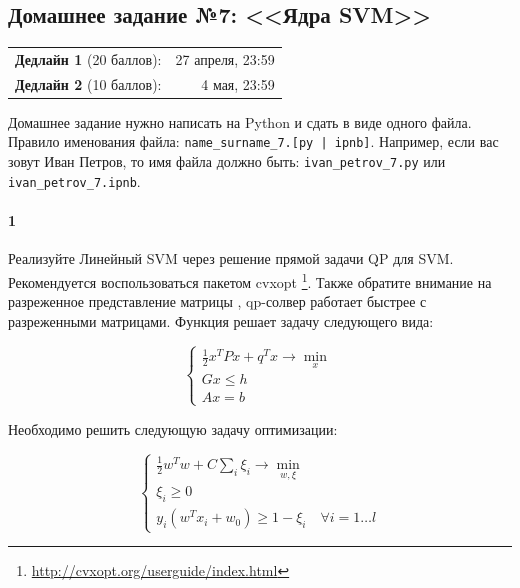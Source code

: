 \documentclass[a4paper,12pt]{article}
\begin{document}
\subsection*{Домашнее задание №7: <<Ядра SVM>>}

\begin{tabular}{@{}lr}
  \textbf{Дедлайн 1} (20 баллов): & 27 апреля, 23:59 \\
  \textbf{Дедлайн 2} (10 баллов): & 4 мая, 23:59
\end{tabular}

Домашнее задание нужно написать на Python и сдать в виде одного файла.
Правило именования файла: \texttt{name\_surname\_7.[py | ipnb]}. Например, если
вас зовут Иван Петров, то имя файла должно быть: \texttt{ivan\_petrov\_7.py} или \texttt{ivan\_petrov\_7.ipnb}.

\makebox[\linewidth]{\hrulefill}

\paragraph{1} Реализуйте Линейный SVM через решение прямой задачи QP для SVM. Рекомендуется воспользоваться пакетом cvxopt \footnote{\url{http://cvxopt.org/userguide/index.html}}. Также обратите внимание на разреженное представление матрицы  , qp-солвер работает быстрее с разреженными матрицами.
Функция  решает задачу следующего вида:


\begin{equation*}
  \begin{cases}
    \frac{1}{2} x^T P x + q^T x \to \min\limits_{x} \\
    Gx \le h \\
    Ax = b
  \end{cases}
\end{equation*}

Необходимо решить следующую задачу оптимизации:

\begin{equation*}
  \begin{cases}
    \frac{1}{2} w^T w + C\sum\limits_{i} \xi_i \to \min\limits_{w, \xi} \\    
    \xi_i \ge 0 \\
    y_i (w^T x_i + w_0) \ge 1 - \xi_i \quad \forall i = 1\dots l
  \end{cases}
\end{equation*}
\end{document}
